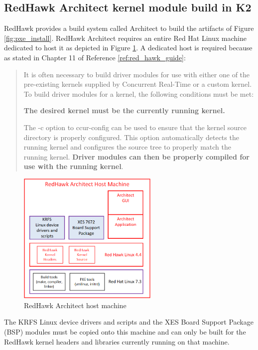 \documentclass[12pt]{article}
\begin{document}
%
\subsection{RedHawk Architect kernel module build in K2}
RedHawk provides a build system called Architect to build the artifacts of Figure
\ref{fig:pxe_install}. RedHawk Architect requires an entire Red Hat Linux
machine dedicated to host it as depicted in Figure \ref{fig:architect_host}. A
dedicated host is required because as stated in Chapter 11 of Reference
\ref{ref:red_hawk_guide}:

\begin{quote}
It is often necessary to build driver modules for use with either one of the pre-existing
kernels supplied by Concurrent Real-Time or a custom kernel.
To build driver modules for a kernel, the following conditions must be met:

\textbf{The desired kernel must be the currently running kernel.}

The -c option to ccur-config can be used to ensure that the kernel source
directory is properly configured. This option automatically detects the running
kernel and configures the source tree to properly match the running kernel.
\textbf{Driver modules can then be properly compiled for use with the running
kernel}.
\end{quote}

\begin{figure}[H]
    \begin{center}
    \includegraphics[width=0.6\textwidth]{img/architect_host}
    \caption{RedHawk Architect host machine}
    \label{fig:architect_host}
    \end{center}
\end{figure}

The KRFS Linux device drivers and scripts and the XES Board Support Package
(BSP) modules must be copied onto this machine and can only be built for the RedHawk kernel headers and libraries currently running on that machine.
\end{document}
